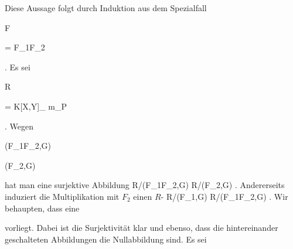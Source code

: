 {


Diese Aussage folgt durch Induktion aus dem Spezialfall


\mavergleichskette

{\vergleichskette

{F
}

{ = }{ F_1F_2
}

{  }{
}

{    }{
}

{   }{
}

}
{}{}{}
 {} {.}
Es sei


\mavergleichskette

{\vergleichskette

{ R
}

{ = }{ K[X,Y]_{ {\mathfrak m}_P }
}

{  }{
}

{    }{
}

{   }{
}

}
{}{}{.}
Wegen


\mavergleichskette

{\vergleichskette

{ (F_1F_2,G)
}

{ \subseteq }{ (F_2,G)
}

{  }{
}

{    }{
}

{   }{
}

}
{}{}{}
hat man eine surjektive Abbildung
\maabb {} { R/(F_1F_2,G)  } { R/(F_2,G)
} {.}
Andererseits induziert die Multiplikation mit $F_2$ einen
$R$-
\maabb {} { R/(F_1,G) } { R/(F_1F_2,G)
} {.}
Wir behaupten, dass eine


 {  }


vorliegt. Dabei ist die Surjektivität klar und ebenso, dass die hintereinander geschalteten Abbildungen die Nullabbildung sind. Es sei


}
